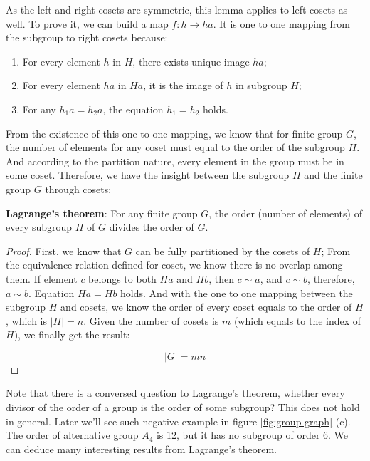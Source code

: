 \documentclass[b5paper]{article}
\begin{document}
As the left and right cosets are symmetric, this lemma applies to left cosets as well. To prove it, we can build a map $f: h \to ha$. It is one to one mapping from the subgroup to right cosets because:

\begin{enumerate}
\item For every element $h$ in $H$, there exists unique image $ha$;
\item For every element $ha$ in $Ha$, it is the image of $h$ in subgroup $H$;
\item For any $h_1a = h_2a$, the equation $h_1 = h_2$ holds.
\end{enumerate}

From the existence of this one to one mapping, we know that for finite group $G$, the number of elements for any coset must equal to the order of the subgroup $H$. And according to the partition nature, every element in the group must be in some coset. Therefore, we have the insight between the subgroup $H$ and the finite group $G$ through cosets:

\begin{theorem}
\textbf{Lagrange's theorem}: For any finite group $G$, the order (number of elements) of every subgroup $H$ of $G$ divides the order of $G$.
\end{theorem}

\begin{proof}
First, we know that $G$ can be fully partitioned by the cosets of $H$; From the equivalence relation defined for coset, we know there is no overlap among them. If element $c$ belongs to both $Ha$ and $Hb$, then $c \sim a$, and $c \sim b$, therefore, $a \sim b$. Equation $Ha = Hb$ holds. And with the one to one mapping between the subgroup $H$ and cosets, we know the order of every coset equals to the order of $H$, which is $|H| = n$. Given the number of cosets is $m$ (which equals to the index of $H$), we finally get the result:

\[
|G| = mn
\]
\end{proof}

Note that there is a conversed question to Lagrange's theorem, whether every divisor of the order of a group is the order of some subgroup? This does not hold in general. Later we'll see such negative example in figure \ref{fig:group-graph} (c). The order of alternative group $A_4$ is 12, but it has no subgroup of order 6. We can deduce many interesting results from Lagrange's theorem.
\end{document}
